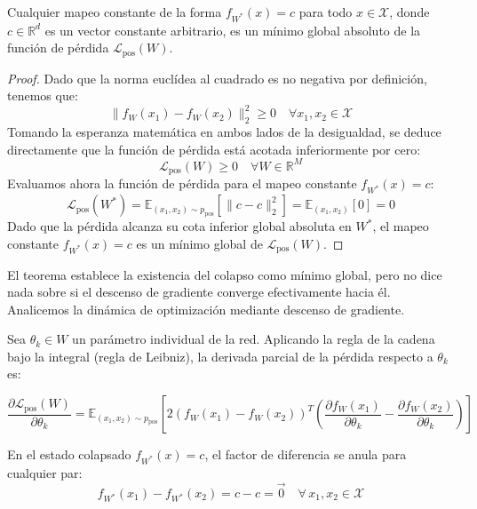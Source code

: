 \begin{theorem}
Cualquier mapeo constante de la forma $f_{W^*}(x) = c$ para todo $x \in \mathcal{X}$, donde $c \in \mathbb{R}^d$ es un vector constante arbitrario, es un mínimo global absoluto de la función de pérdida $\mathcal{L}_{\text{pos}}(W)$.
\end{theorem}

\begin{proof}
Dado que la norma euclídea al cuadrado es no negativa por definición, tenemos que:
\begin{equation}
\| f_W(x_1) - f_W(x_2) \|_2^2 \ge 0 \quad \forall x_1, x_2 \in \mathcal{X}
\end{equation}
Tomando la esperanza matemática en ambos lados de la desigualdad, se deduce directamente que la función de pérdida está acotada inferiormente por cero:
\begin{equation}
\mathcal{L}_{\text{pos}}(W) \ge 0 \quad \forall W \in \mathbb{R}^M
\end{equation}
Evaluamos ahora la función de pérdida para el mapeo constante $f_{W^*}(x) = c$:
\begin{equation}
\mathcal{L}_{\text{pos}}(W^*) = \mathbb{E}_{(x_1, x_2) \sim p_{\text{pos}}} \left[ \| c - c \|_2^2 \right] = \mathbb{E}_{(x_1, x_2)} [ 0 ] = 0
\end{equation}
Dado que la pérdida alcanza su cota inferior global absoluta en $W^*$, el mapeo constante $f_{W^*}(x) = c$ es un mínimo global de $\mathcal{L}_{\text{pos}}(W)$.
\end{proof}


El teorema establece la existencia del colapso como mínimo global, pero no dice nada 
sobre si el descenso de gradiente converge efectivamente hacia él. Analicemos la dinámica de optimización mediante descenso de gradiente. 

Sea $\theta_k \in W$ un parámetro individual de la red. Aplicando la regla de la cadena bajo la integral (regla de Leibniz), la derivada parcial de la pérdida respecto a $\theta_k$ es:

\begin{equation}
\frac{\partial \mathcal{L}_{\text{pos}}(W)}{\partial \theta_k} = \mathbb{E}_{(x_1, x_2) \sim p_{\text{pos}}} \left[ 2 \left( f_W(x_1) - f_W(x_2) \right)^T \left( \frac{\partial f_W(x_1)}{\partial \theta_k} - \frac{\partial f_W(x_2)}{\partial \theta_k} \right) \right]
\end{equation}

En el estado colapsado $f_{W^*}(x) = c$, el factor de diferencia se anula para cualquier par:
\begin{equation}
f_{W^*}(x_1) - f_{W^*}(x_2) = c - c = \vec{0} \quad \forall\, x_1, x_2 \in \mathcal{X}
\end{equation}

